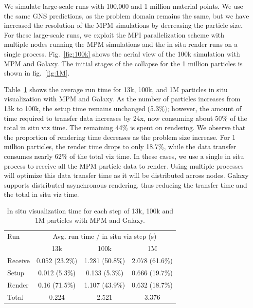 \documentclass{vgtc}
\begin{document}
We simulate large-scale runs with 100,000 and 1 million material points. We use the same GNS predictions, as the problem domain remains the same, but we have increased the resolution of the MPM simulations by decreasing the particle size. For these large-scale runs, we exploit the MPI parallelization scheme with multiple nodes running the MPM simulations and the in situ render runs on a single process. Fig.~\ref{fig:100k} shows the aerial view of the 100k simulation with MPM and Galaxy. The initial stages of the collapse for the 1 million particles is shown in fig.~\ref{fig:1M}. 

Table~\ref{tab:totalruntimes} shows the average run time for 13k, 100k, and 1M particles in situ visualization with MPM and Galaxy. As the number of particles increases from 13k to 100k, the setup time remains unchanged (5.3\%); however, the amount of time required to transfer data increases by 24x, now consuming about 50\% of the total in situ viz time. The remaining 44\% is spent on rendering. We observe that the proportion of rendering time decreases as the problem size increase. For 1 million particles, the render time drops to only 18.7\%, while the data transfer consumes nearly 62\% of the total viz time. In these cases, we use a single in situ process to receive all the MPM particle data to render. Using multiple processes will optimize this data transfer time as it will be distributed across nodes. Galaxy supports distributed asynchronous rendering, thus reducing the transfer time and the total in situ viz time.


\begin{table}[h!]
    \centering
    \caption{In situ visualization time for each step of 13k, 100k and 1M particles with MPM and Galaxy.}
    \label{tab:totalruntimes}
    \begin{tabular}{l c c c} 
     \toprule
     Run & \multicolumn{3}{c}{Avg. run time / in situ viz step (s)} \\ 
     \cmidrule{2-4}
     & 13k & 100k & 1M \\
     \midrule
     Receive & 0.052 (23.2\%) & 1.281 (50.8\%) & 2.078 (61.6\%)\\
     Setup & 0.012  (5.3\%) & 0.133 (5.3\%)& 0.666 (19.7\%)\\
     Render & 0.16  (71.5\%)& 1.107 (43.9\%)& 0.632 (18.7\%)\\
     \midrule
     Total & 0.224  & 2.521 & 3.376 \\
     \bottomrule
     \end{tabular}
 \end{table}
\end{document}
